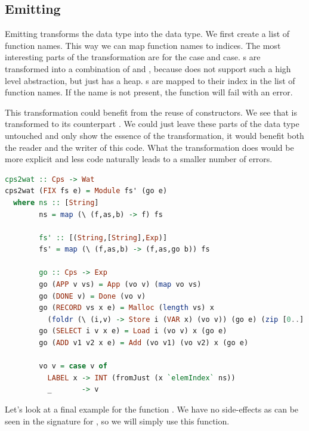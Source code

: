 {\subsection{\label{section:emit}Emitting}
Emitting transforms the  data type into the  data type. We first create a list of function names. This way we can map function names to indices. The most interesting parts of the transformation are for the  case and  case. s are transformed into a combination of  and , because  does not support such a high level abstraction, but just has a heap. s are mapped to their index in the list of function names. If the name is not present, the function will fail with an error.

This transformation could benefit from the reuse of constructors. We see that  is transformed to its  counterpart . We could just leave these parts of the data type untouched and only show the essence of the transformation, it would benefit both the reader and the writer of this code. What the transformation does would be more explicit and less code naturally leads to a smaller number of errors.

\begin{lstlisting}[language=Haskell]
cps2wat :: Cps -> Wat
cps2wat (FIX fs e) = Module fs' (go e)
  where ns :: [String]
        ns = map (\ (f,as,b) -> f) fs

        fs' :: [(String,[String],Exp)]
        fs' = map (\ (f,as,b) -> (f,as,go b)) fs

        go :: Cps -> Exp
        go (APP v vs) = App (vo v) (map vo vs)
        go (DONE v) = Done (vo v)
        go (RECORD vs x e) = Malloc (length vs) x
          (foldr (\ (i,v) -> Store i (VAR x) (vo v)) (go e) (zip [0..] vs))
        go (SELECT i v x e) = Load i (vo v) x (go e)
        go (ADD v1 v2 x e) = Add (vo v1) (vo v2) x (go e)

        vo v = case v of
          LABEL x -> INT (fromJust (x `elemIndex` ns))
          _       -> v
\end{lstlisting}

Let's look at a final example for the function . We have no side-effects as can be seen in the signature for , so we will simply use this function.

}
